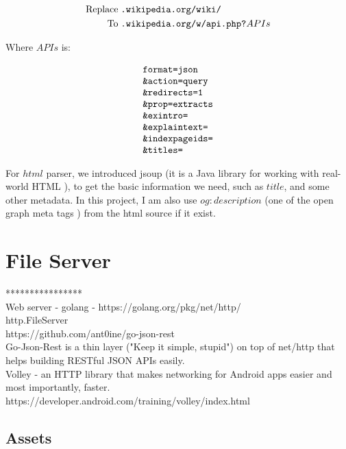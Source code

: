 \[
\begin{array}{lr}
\begin{aligned}
\text{Replace}\;&\texttt{.wikipedia.org/wiki/} \\
\text{To}\;&\texttt{.wikipedia.org/w/api.php?}APIs\\
\end{aligned}
\end{array}
\]

Where $APIs$ is:

\[
\begin{array}{lr}
\texttt{format=json} \\
\texttt{\&action=query} \\
\texttt{\&redirects=1} \\
\texttt{\&prop=extracts} \\
\texttt{\&exintro=} \\
\texttt{\&explaintext=} \\
\texttt{\&indexpageids=} \\
\texttt{\&titles=}
\end{array}
\]

For $html$ parser, we introduced jsoup (it is a Java library for working with real-world HTML \parencite{joup.2016}), to get the basic information we need, such as $title$, and some other metadata. In this project, I am also use $og:description$ (one of the open graph meta tags \parencite{ogp.2014}) from the html source if it exist.
\section{File Server}

****************\\
Web server - golang - https://golang.org/pkg/net/http/\\
http.FileServer\\
https://github.com/ant0ine/go-json-rest\\
Go-Json-Rest is a thin layer ("Keep it simple, stupid") on top of net/http that helps building RESTful JSON APIs easily.\\
Volley - an HTTP library that makes networking for Android apps easier and most importantly, faster.\\
https://developer.android.com/training/volley/index.html\\

\subsection{Assets}


